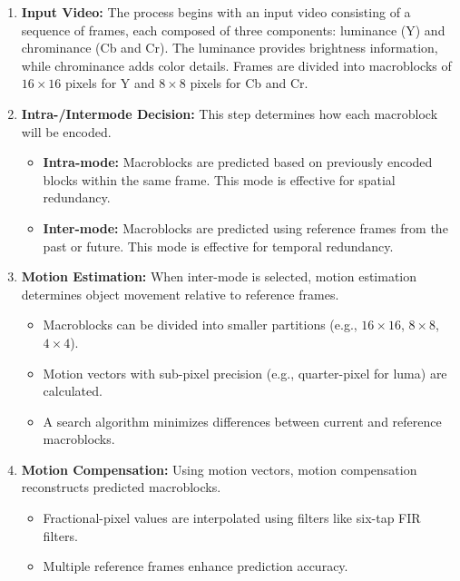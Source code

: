 \documentclass{ioereport}
\begin{document}
    \begin{enumerate}[label=\textbf{\roman*.}]
        \item \textbf{Input Video:}  
        The process begins with an input video consisting of a sequence of frames, each composed of three components: luminance (Y) and chrominance (Cb and Cr). The luminance provides brightness information, while chrominance adds color details. Frames are divided into macroblocks of $16 \times 16$ pixels for Y and $8 \times 8$ pixels for Cb and Cr.
    
        \item \textbf{Intra-/Intermode Decision:}  
        This step determines how each macroblock will be encoded.
        \begin{itemize}
            \item \textbf{Intra-mode:} Macroblocks are predicted based on previously encoded blocks within the same frame. This mode is effective for spatial redundancy.
            \item \textbf{Inter-mode:} Macroblocks are predicted using reference frames from the past or future. This mode is effective for temporal redundancy.
        \end{itemize}
    
        \item \textbf{Motion Estimation:}  
        When inter-mode is selected, motion estimation determines object movement relative to reference frames.
        \begin{itemize}
            \item Macroblocks can be divided into smaller partitions (e.g., $16 \times 16$, $8 \times 8$, $4 \times 4$).
            \item Motion vectors with sub-pixel precision (e.g., quarter-pixel for luma) are calculated.
            \item A search algorithm minimizes differences between current and reference macroblocks.
        \end{itemize}
    
        \item \textbf{Motion Compensation:}  
        Using motion vectors, motion compensation reconstructs predicted macroblocks.
        \begin{itemize}
            \item Fractional-pixel values are interpolated using filters like six-tap FIR filters.
            \item Multiple reference frames enhance prediction accuracy.
        \end{itemize}
    

\end{enumerate}
\end{document}
